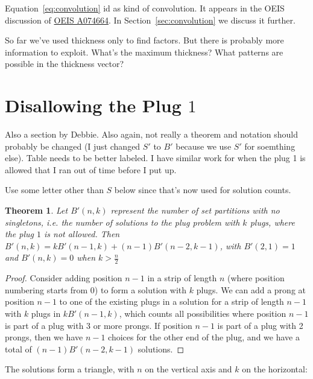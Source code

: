 \documentclass[10pt]{article}
\newtheorem{theorem}{Theorem}
\numberwithin{equation}{section}
\newenvironment{anote}
               {{\textcolor{blue}{Note:}}
                 \itshape
               }
               {}
\begin{document}
Equation~\ref{eq:convolution} id as kind of convolution. It appears in the OEIS discussion of \href{https://oeis.org/A074664}{OEIS A074664}. In Section~\ref{sec:convolution} we discuss it further.

\begin{anote}
So far we've used thickness only to find factors. But there is
probably more information to exploit. What's the maximum thickness?
What patterns are possible in the thickness vector?
\end{anote}

\section {Disallowing the Plug $1$}

\begin{anote}
Also a section by Debbie.  Also again, not really a theorem and notation should probably be changed (I just changed $S'$ to $B'$ because we use $S'$ for soemthing else). Table needs to be better labeled.  I have similar work for when the plug 1 is allowed that I ran out of time before I put up. 
\end{anote}

\begin{anote}
Use some letter other than $S$ below since that's now used for solution counts.
\end{anote}
\begin{theorem}
Let $B'(n,k)$ represent the number of set partitions with no singletons, i.e. the number of solutions to the plug problem with $k$ plugs, where the plug $1$ is not allowed. Then $B'(n,k) = kB'(n-1,k) + (n-1)B'(n-2,k-1)$, with $B'(2,1)=1$ and $B'(n,k) =0$ when $k > \frac{n}{2}$
\end{theorem}

\begin{proof}
Consider adding position $n-1$ in a strip of length $n$ (where position numbering starts from $0$) to form a solution with $k$ plugs. We can add a prong at position $n-1$ to one of the existing plugs in a solution for a strip of length $n-1$ with $k$ plugs in $kB'(n-1,k)$, which counts all possibilities where position $n-1$ is part of a plug with 3 or more prongs. If position $n-1$ is part of a plug with 2 prongs, then we have $n-1$ choices for the other end of the plug, and we have a total of  $(n-1)B'(n-2,k-1)$ solutions. 
\end{proof}

The solutions form a triangle, with $n$ on the vertical axis and $k$ on the horizontal:
\end{document}
